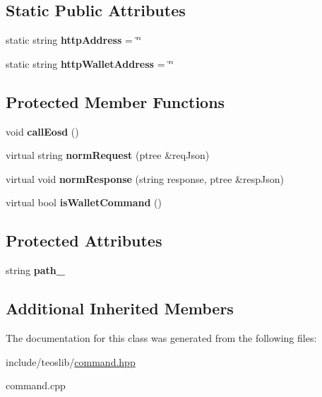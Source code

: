 \subsection*{Static Public Attributes}
\begin{DoxyCompactItemize}
\item 
\mbox{\label{classteos_1_1_teos_command_a54be6ca51cd5c3b55b4fd5506319fcaa}} 
static string {\bfseries http\+Address} = \char`\"{}\char`\"{}
\item 
\mbox{\label{classteos_1_1_teos_command_a3c420a38e2e983faab8a32d26c211a0d}} 
static string {\bfseries http\+Wallet\+Address} = \char`\"{}\char`\"{}
\end{DoxyCompactItemize}
\subsection*{Protected Member Functions}
\begin{DoxyCompactItemize}
\item 
\mbox{\label{classteos_1_1_teos_command_ac770c5eabcc7bfc6d4a8a8b2b0443458}} 
void {\bfseries call\+Eosd} ()
\item 
\mbox{\label{classteos_1_1_teos_command_abcdc20d75a8e8278cdcae8f0bb482515}} 
virtual string {\bfseries norm\+Request} (ptree \&req\+Json)
\item 
\mbox{\label{classteos_1_1_teos_command_afc2c37d50b3fda078ce3195d9922ab8e}} 
virtual void {\bfseries norm\+Response} (string response, ptree \&resp\+Json)
\item 
\mbox{\label{classteos_1_1_teos_command_a5f377d19a8bb692b2c3008d4b916a950}} 
virtual bool {\bfseries is\+Wallet\+Command} ()
\end{DoxyCompactItemize}
\subsection*{Protected Attributes}
\begin{DoxyCompactItemize}
\item 
\mbox{\label{classteos_1_1_teos_command_a263794bdfe8ef1ee2e01e8a5253495f9}} 
string {\bfseries path\+\_\+}
\end{DoxyCompactItemize}
\subsection*{Additional Inherited Members}


The documentation for this class was generated from the following files\+:\begin{DoxyCompactItemize}
\item 
include/teoslib/\mbox{\hyperlink{command_8hpp}{command.\+hpp}}\item 
command.\+cpp\end{DoxyCompactItemize}
